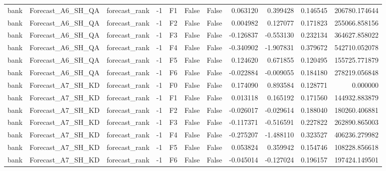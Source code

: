 \begin{tabular}{lllrlllrrrr}
      bank &            Forecast\_A6\_SH\_QA & forecast\_rank &    -1 &  F1 &           False &            False &  0.063120 &  0.399428 & 0.146545 &    206780.174644 \\
      bank &            Forecast\_A6\_SH\_QA & forecast\_rank &    -1 &  F2 &           False &            False &  0.004982 &  0.127077 & 0.171823 &    255066.858156 \\
      bank &            Forecast\_A6\_SH\_QA & forecast\_rank &    -1 &  F3 &           False &            False & -0.126837 & -0.553130 & 0.232134 &    364627.858022 \\
      bank &            Forecast\_A6\_SH\_QA & forecast\_rank &    -1 &  F4 &           False &            False & -0.340902 & -1.907831 & 0.379672 &    542710.052078 \\
      bank &            Forecast\_A6\_SH\_QA & forecast\_rank &    -1 &  F5 &           False &            False &  0.124620 &  0.671855 & 0.120495 &    155725.771879 \\
      bank &            Forecast\_A6\_SH\_QA & forecast\_rank &    -1 &  F6 &           False &            False & -0.022884 & -0.009055 & 0.184180 &    278219.056848 \\
      bank &            Forecast\_A7\_SH\_KD & forecast\_rank &    -1 &  F0 &           False &            False &  0.174090 &  0.893584 & 0.128771 &         0.000000 \\
      bank &            Forecast\_A7\_SH\_KD & forecast\_rank &    -1 &  F1 &           False &            False &  0.013118 &  0.165192 & 0.171560 &    144932.883879 \\
      bank &            Forecast\_A7\_SH\_KD & forecast\_rank &    -1 &  F2 &           False &            False & -0.026017 & -0.029614 & 0.188040 &    180260.406881 \\
      bank &            Forecast\_A7\_SH\_KD & forecast\_rank &    -1 &  F3 &           False &            False & -0.117371 & -0.516591 & 0.227822 &    262890.865003 \\
      bank &            Forecast\_A7\_SH\_KD & forecast\_rank &    -1 &  F4 &           False &            False & -0.275207 & -1.488110 & 0.323527 &    406236.279982 \\
      bank &            Forecast\_A7\_SH\_KD & forecast\_rank &    -1 &  F5 &           False &            False &  0.053824 &  0.359942 & 0.154746 &    108228.856618 \\
      bank &            Forecast\_A7\_SH\_KD & forecast\_rank &    -1 &  F6 &           False &            False & -0.045014 & -0.127024 & 0.196157 &    197424.149501 \\

\end{tabular}
